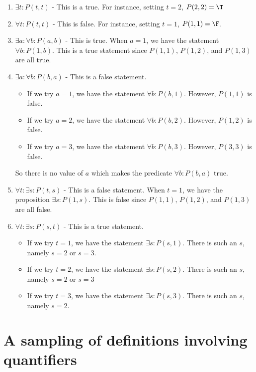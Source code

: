 \begin{solutions}
		\begin{enumerate}
		\item $\exists t: P(t,t)$ - This is a true.  For instance, setting $t = 2$, $P(2,2) = \T$
		\item $\forall t: P(t,t)$ - This is false.  For instance, setting $t =1$, $P(1,1) = \F$.
		\item $\exists a: \forall b: P(a,b)$ - This is true.  When $a = 1$, we have the statement $\forall b: P(1,b)$.  This is a true statement since $P(1,1)$, $P(1,2)$, and $P(1,3)$ are all true.
		\item $\exists a: \forall b: P(b,a)$ - This is a false statement.  
		\begin{itemize}
				\item If we try $a = 1$, we have the statement $\forall b: P(b,1)$.  However, $P(1,1)$ is false.
				\item If we try $a = 2$, we have the statement $\forall b: P(b,2)$.  However, $P(1,2)$ is false.
				\item If we try $a = 3$, we have the statement $\forall b: P(b,3)$.  However, $P(3,3)$ is false.
			\end{itemize}
		
		So there is no value of $a$ which makes the predicate $\forall b: P(b,a)$ true.
		\item $\forall t: \exists s: P(t,s)$ - This is a false statement.  When $t  =1$, we have the proposition $\exists s: P(1,s)$.  This is false since $P(1,1)$, $P(1,2)$, and $P(1,3)$ are all false.
		\item $\forall t: \exists s: P(s,t)$  - This is a true statement.  
		
				\begin{itemize}
			\item If we try $t = 1$, we have the statement $\exists s: P(s,1)$.  There is such an $s$, namely $s = 2$ or $s = 3$.
			\item If we try $t = 2$, we have the statement $\exists s: P(s,2)$.  There is such an $s$, namely $s = 2$ or $s = 3$
			\item If we try $t = 3$, we have the statement $\exists s: P(s,3)$.  There is such an $s$, namely $s = 2$.
		\end{itemize}
	\end{enumerate}
	\end{solutions}


\section{A sampling of definitions involving quantifiers}

